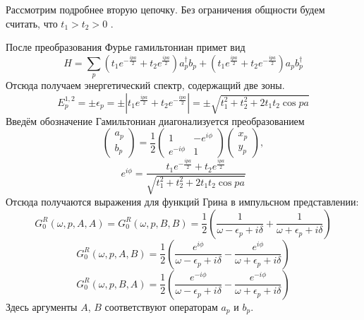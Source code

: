 Рассмотрим подробнее вторую цепочку. Без ограничения общности будем считать, что
$t_1 > t_2 > 0$ .

После преобразования Фурье гамильтониан примет вид
\begin{equation}
	H = \sum_p 
			(t_1 e^{-\frac{ipa}{2}} + t_2 e^{\frac{ipa}{2}}) a_p^\dagger b_p + 
			(t_1 e^{\frac{ipa}{2}} + t_2 e^{-\frac{ipa}{2}}) a_p b_p^\dagger
\end{equation}
Отсюда получаем энергетический спектр, содержащий две зоны.
\begin{equation}
	E_p^{1,2} = \pm \epsilon_p = \pm|t_1 e^{\frac{ipa}{2}} + t_2 e^{-\frac{ipa}{2}}| = 
		\pm\sqrt{t_1^2 + t_2^2 + 2t_1t_2 \cos{pa}}
\end{equation}
Введём обозначение 
Гамильтониан диагонализуется преобразованием
\begin{equation}
	\left(
	\begin{matrix}
		a_p \\
		b_p
	\end{matrix}
	\right)
	=
	\frac12
	\left(
	\begin{matrix}
		1 & -e^{i\phi}	\\
		e^{-i\phi} & 1
	\end{matrix}
	\right)
	\left(
	\begin{matrix}
		x_p \\
		y_p
	\end{matrix}
	\right),
\end{equation}
\begin{equation}
	e^{i\phi} = \frac{t_1 e^{-\frac{ipa}{2}} + t_2 e^{\frac{ipa}{2}}}
				{\sqrt{t_1^2 + t_2^2 + 2t_1t_2 \cos{pa}}}
\end{equation}
Отсюда получаются выражения для функций Грина в импульсном представлении:
\begin{equation}
	\label{gaa}
	G^R_0 (\omega, p, A, A) =  G^R_0 (\omega, p, B, B) = \frac{1}{2}\left(
		\frac{1}{\omega - \epsilon_p + i\delta} + 
					\frac{1}{\omega + \epsilon_p + i\delta}\right)
\end{equation}
\begin{equation}
	G^R_0 (\omega, p, A, B) = \frac12 \left(\frac{e^{i\phi}}{\omega - \epsilon_p + i\delta} -
						\frac{e^{i\phi}}{\omega + \epsilon_p + i\delta} \right)
\end{equation}
\begin{equation}
	G^R_0 (\omega, p, B, A) = \frac12 \left(\frac{e^{-i\phi}}{\omega - \epsilon_p + i\delta} -
						\frac{e^{-i\phi}}{\omega + \epsilon_p + i\delta} \right)
\end{equation}
Здесь аргументы $A$, $B$ соответствуют операторам $a_p$ и $b_p$. 

